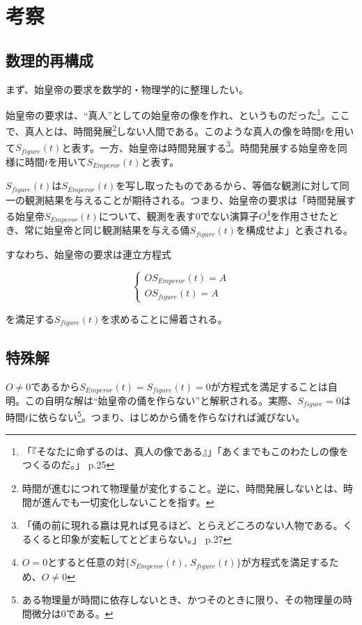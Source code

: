 \documentclass[10pt, a5paper, twoside]{jsarticle}
\theoremstyle{definition}
\begin{document}
	\section{考察}

		\subsection{数理的再構成}

		まず、始皇帝の要求を数学的・物理学的に整理したい。

		始皇帝の要求は、“真人”としての始皇帝の像を作れ、というものだった\footnote{「『そなたに命ずるのは、真人の像である』」「あくまでもこのわたしの像をつくるのだ。」\cite{mojika} p.25}。ここで、真人とは、時間発展\footnote{時間が進むにつれて物理量が変化すること。逆に、時間発展しないとは、時間が進んでも一切変化しないことを指す。}しない人間である。このような真人の像を時間$t$を用いて$ S_{figure}(t) $と表す。一方、始皇帝は時間発展する\footnote{「俑の前に現れる嬴は見れば見るほど、とらえどころのない人物である。くるくると印象が変転してとどまらない。」\cite{mojika} p.27}。時間発展する始皇帝を同様に時間$t$を用いて$ S_{Emperor}(t) $と表す。

		$S_{figure}(t)$は$S_{Emperor}(t)$を写し取ったものであるから、等価な観測に対して同一の観測結果を与えることが期待される。つまり、始皇帝の要求は「時間発展する始皇帝$ S_{Emperor}(t) $について、観測を表す0でない演算子$ O $\footnote{$ O = 0 $とすると任意の対$ \{ S_{Emperor}(t)$, $ S_{figure}(t) \} $が方程式を満足するため、$ O \neq 0 $}を作用させたとき、常に始皇帝と同じ観測結果を与える俑$ S_{figure}(t) $を構成せよ」と表される。

		すなわち、始皇帝の要求は連立方程式

		\begin{equation*}
			\begin{cases}
				O S_{Emperor}(t) = A \\ O S_{figure}(t) = A
			\end{cases}
		\end{equation*}

		を満足する$ S_{figure}(t) $を求めることに帰着される。

		\subsection{特殊解}\label{spe}

			$ O \neq 0 $であるから$ S_{Emperor}(t) = S_{figure}(t) = 0 $が方程式を満足することは自明。この自明な解は“始皇帝の俑を作らない”と解釈される。実際、$ S_{figure} = 0 $は時間$t$に依らない\footnote{ある物理量が時間に依存しないとき、かつそのときに限り、その物理量の時間微分は0である。}。つまり、はじめから俑を作らなければ滅びない。
\end{document}
